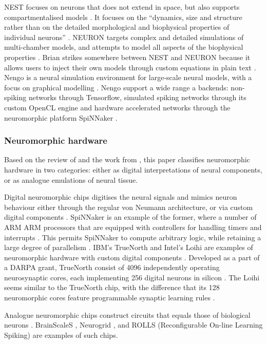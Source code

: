 \documentclass[report.tex]{subfiles}
\begin{document}
NEST focuses on neurons that does not extend in space, 
but also supports compartmentalised models \cite{Gewaltig2007}.
It focuses on the ``dynamics, size and structure rather than on the detailed
morphological and biophysical properties of individual neurons'' \cite{Gewaltig2007}.
NEURON targets complex and detailed simulations of multi-chamber models, and
attempts to model all aspects of the biophysical properties \cite{Carnevale2007}.
Brian strikes somewhere between NEST and NEURON because it allows users to
inject their own models through custom equations in plain text \cite{Goodman2013}.
Nengo is a neural simulation environment for large-scale neural models, with
a focus on graphical modelling \cite{Eliasmith2015}. 
Nengo support a wide range a backends: non-spiking networks through Tensorflow,
simulated spiking networks through its custom \gls{OpenCL} engine and 
hardware accelerated networks through the neuromorphic platform SpiNNaker
\cite{Nengo2018}.

\subsubsection{Neuromorphic hardware}
Based on the review of \textcite{Walter2015} and the work from
\cite{Lin2018}, this paper classifies neuromorphic hardware in two
categories: either as digital interpretations of neural components, 
or as analogue emulations of neural tissue.

Digital neuromorphic chips digitises the neural signals and mimics neuron
behaviour either through the regular \gls{von Neumann} architecture, or
via custom digital components \cite{Walter2015}.
SpiNNaker is an example of the former, where a number of ARM \gls{ARM}
processors that are equipped with controllers for handling timers and
interrupts \cite{Walter2015}.
This permits SpiNNaker to compute arbitrary logic, while retaining
a large degree of parallelism \cite{Albada2018}.
IBM's TrueNorth  and Intel's Loihi 
are examples of neuromorphic hardware with custom digital components 
\cite{Walter2015, Lin2018}.
Developed as a part of a \gls{DARPA} grant, TrueNorth consist of 4096
independently operating neurosynaptic cores, each implementing 256
digital neurons in silicon \cite{Walter2015, ArtificialBrains2018}.
The Loihi seems similar to the TrueNorth chip, with the difference that
its 128 neuromorphic cores feature programmable
synaptic learning rules \cite{Lin2018}.

Analogue neuromorphic chips construct circuits that equals those of biological
neurons \cite{Walter2015}.
BrainScaleS \cite{Schmitt2017}, Neurogrid \cite{BrainsInSilicon2018}, 
and ROLLS (Reconfigurable On-line Learning Spiking)
\cite{Walter2015} are examples of such chips.
\end{document}
